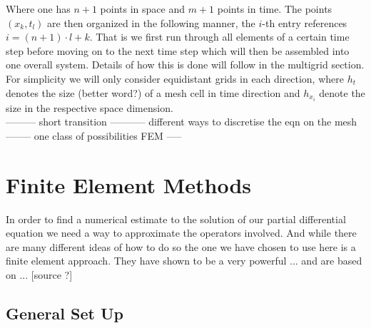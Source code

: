 \documentclass[fleqn, a4paper, 11pt, bibliography=totoc]{report}
\begin{document}
Where one has $n+1$ points in space and $m+1$ points in time. The points $(x_k, t_l)$ are then organized in the following manner, the $i$-th entry references $i = (n+1) \cdot l + k$. That is we first run through all elements of a certain time step before moving on to the next time step which will then be assembled into one overall system. Details of how this is done will follow in the multigrid section. For simplicity we will only consider equidistant grids in each direction, where $h_t$ denotes the size (better word?) of a mesh cell in time direction and $h_{x_i}$ denote the size in the respective space dimension. 
\bigskip
\\
--------- short transition ----------- different ways to discretise the eqn on the mesh -------- one class of possibilities FEM -----

\section{Finite Element Methods}

In order to find a numerical estimate to the solution of our partial differential equation we need a way to approximate the operators involved. And while there are many different ideas of how to do so the one we have chosen to use here is a finite element approach. They have shown to be a very powerful ... and are based on ... [source ?]

\subsection{General Set Up}
\end{document}
